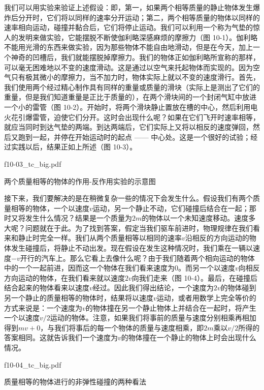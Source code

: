\documentclass[12pt,oneside]{book}
\begin{document}
我们可以用实验来验证上述假设：即，第一，如果两个相等质量的静止物体发生爆炸后分开时，它们将以同样的速率分开运动；第二，两个相等质量的物体以同样的速率相向运动，碰撞并黏合后，它们将停止运动。我们可以利用一个称为气垫的惊人的发明来做实验，它能摆脱不断使伽利略深感麻烦的摩擦力（图 10-1）。伽利略不能用光滑的东西来做实验，因为那些物体不能自由地滑动，但是在今天，加上一个神奇的凹槽后，我们就能摆脱掉摩擦力。我们的物体正如伽利略所宣称的那样，可以毫无困难地以不变的速度滑动。这是通过以空气来托起物体而实现的。因为空气只有极其微小的摩擦力，当不加力时，物体实际上就以不变的速度滑行。首先，我们使用两个经过精心制作具有同样的重量或质量的滑块（实际上是测出了它们的重量，但是我们知道重量是正比于质量的），在两个滑块间的一个封闭气缸中放进一个小的雷管（图 10-2）。开始时，将两个滑块静止置放在槽的中心，然后利用电火花引爆雷管，迫使它们分开。这时会出现什么呢？如果在它们飞开时速率相等，就应当同时到达气垫的两端。到达两端后，它们实际上又将以相反的速度弹回，然后又跑到一起，并停在开始运动时的起点 —— 中心处。这是一个很好的试验；经过实践以后，结果正如上所述（图 10-3）。

\begin{fig}{f10-03_tc_big.pdf}
\caption{两个质量相等的物体的作用-反作用实验的示意图}
\label{fig:两个质量相等的物体的作用-反作用实验的示意图}
\end{fig}


接下来，我们要解决的是在稍微复杂一些的情况下会发生什么。假设我们有两个质量相等的物体，一个以速度$v$运动，另一个静止不动，它们碰撞后结合在一起；那时又将发生什么情况？结果是一个质量为$2m$的物体以一个未知速度移动。速度多大呢？问题就在于此。为了找到答案，假定当我们驱车前进时，物理规律在我们看来和静止时完全一样。我们从两个质量相等以相同的速率$v$沿相反的方向运动的物体发生碰撞后，将静止不动出发。现在假设在发生这种情况时，我们乘在一辆以速度$-v$开行的汽车上。那么它看上去像什么呢？由于我们随着两个相向运动的物体中的一个一起前进，因而这一个物体在我们看来速度为$0$。而另一个以速度$v$向相反方向运动的物体，在我们看来就以速度$2v$向我们走来（图 10-4）。最后，在碰撞后结合起来的物体看来以速度$v$经过。因此我们得出结论，一个速度为$2v$的物体碰到另一个静止的质量相等的物体时，结果将以速度$v$运动，或者用数学上完全等价的方式来说是：一个速度为$v$的物体撞在另一个静止物体上并结合在一起时，将产生一个以速度$v/2$运动的物体。注意，如果我们将事前的质量与速度分别相乘再相加得到$mv + 0$，与我们将事后的每一个物体的质量与速度相乘，即$2m$乘以$v/2$所得的答案相同。这就告诉我们一个速度为$v$的物体撞在一个静止的物体上时会出现什么情况。

\begin{fig}{f10-04_tc_big.pdf}
\caption{质量相等的物体进行的非弹性碰撞的两种看法}
\label{fig:质量相等的物体进行的非弹性碰撞的两种看法}
\end{fig}
\end{document}
